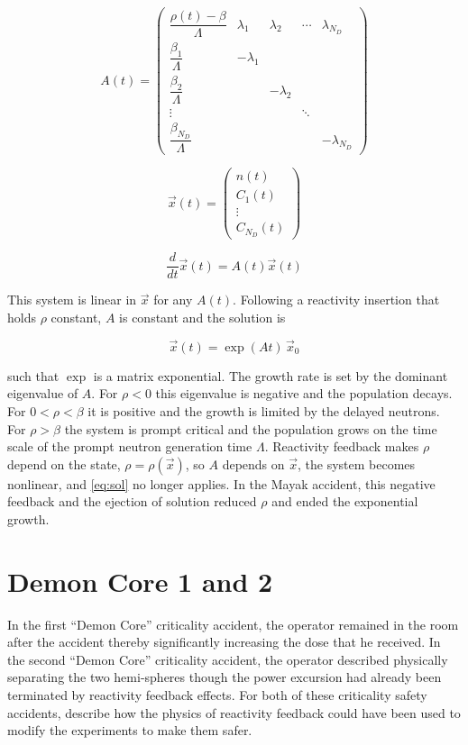 \documentclass[11pt,a4paper]{article}
\begin{document}
\begin{equation}
A(t) =
\begin{pmatrix}
\dfrac{\rho(t)-\beta}{\Lambda} & \lambda_1 & \lambda_2 & \cdots & \lambda_{N_D} \\[1.5ex]
\dfrac{\beta_1}{\Lambda} & -\lambda_1 & & & \\[1.5ex]
\dfrac{\beta_2}{\Lambda} & & -\lambda_2 & & \\[1.5ex]
\vdots & & & \ddots & \\[1.5ex]
\dfrac{\beta_{N_D}}{\Lambda} & & & & -\lambda_{N_D}
\end{pmatrix}
\end{equation}

\begin{equation}
\vec{x}(t) =
\begin{pmatrix}
n(t) \\
C_1(t) \\
\vdots \\
C_{N_D}(t)
\end{pmatrix}
\end{equation}

\begin{equation}
\frac{d}{dt}\vec{x}(t) = A(t)\vec{x}(t)
\label{eq:xdot}
\end{equation}

This system is linear in $\vec{x}$ for any $A(t)$. Following a reactivity insertion that holds $\rho$ constant, $A$ is constant and the solution is

\begin{equation}
\vec{x}(t) = \exp(A t)\,\vec{x}_{0}
\label{eq:sol}
\end{equation}

such that $\exp$ is a matrix exponential. The growth rate is set by the dominant eigenvalue of $A$. For $\rho < 0$ this eigenvalue is negative and the population decays. For $0 < \rho < \beta$ it is positive and the growth is limited by the delayed neutrons. For $\rho > \beta$ the system is prompt critical and the population grows on the time scale of the prompt neutron generation time $\Lambda$. Reactivity feedback makes $\rho$ depend on the state, $\rho = \rho(\vec{x})$, so $A$ depends on $\vec{x}$, the system becomes nonlinear, and \cref{eq:sol} no longer applies. In the Mayak accident, this negative feedback and the ejection of solution reduced $\rho$ and ended the exponential growth.

\newpage


\section{Demon Core 1 and 2}
In the first “Demon Core” criticality accident, the operator remained in the room after the
accident thereby significantly increasing the dose that he received. In the second “Demon
Core” criticality accident, the operator described physically separating the two hemi-spheres
though the power excursion had already been terminated by reactivity feedback effects. For
both of these criticality safety accidents, describe how the physics of reactivity feedback could
have been used to modify the experiments to make them safer.
\end{document}
